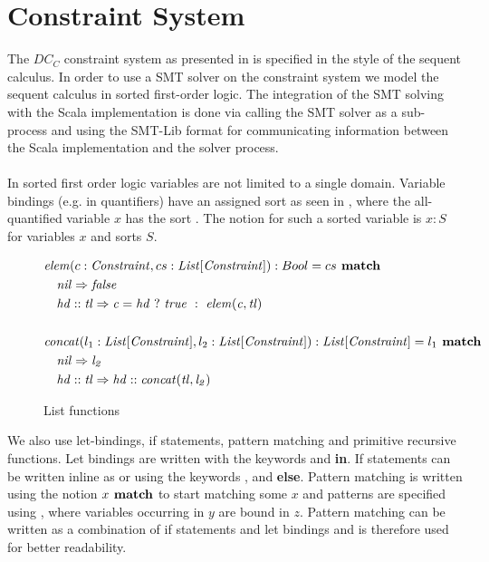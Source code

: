 \section{Constraint System}
\label{sec:constraintsystem}
The $DC_C$ constraint system as presented in 
is specified in the style of the sequent calculus.
In order to use a SMT solver on the constraint system
we model the sequent calculus in sorted first-order logic.
The integration of the SMT solving with the Scala implementation
is done via calling the SMT solver as a sub-process and using
the SMT-Lib format for communicating information between
the Scala implementation and the solver process.
\\ \\
In sorted first order logic variables are not limited to a single domain.
Variable bindings (e.g. in quantifiers)
have an assigned sort as seen in ,
where the all-quantified variable $x$ has the sort .
The notion for such a sorted variable is $x: S$
for variables $x$ and sorts $S$.
\begin{figure}[b]
\begin{align*}
&\mathit{elem}(c: \mathit{Constraint}, cs: \mathit{List[\mathit{Constraint}]}): Bool = cs \textbf{ match}\\
&\quad \mathit{\mathit{nil}} \Rightarrow \mathit{false}\\
&\quad \mathit{hd :: tl} \Rightarrow \mathit{c = hd\ ?\ true\ :\ \mathit{elem}(c, tl)}\\\\
&\mathit{concat}(l_1: \mathit{List[\mathit{Constraint}]}, l_2: \mathit{List[\mathit{Constraint}]}): \mathit{List[\mathit{Constraint}]} = l_1 \textbf{ match}\\
&\quad \mathit{\mathit{nil}} \Rightarrow \mathit{l_2}\\
&\quad \mathit{hd :: tl} \Rightarrow \mathit{hd :: \mathit{concat}(tl, l_2)}
\end{align*}
\caption{List functions}
\label{fig:fo-list-funs}
\end{figure}
%
We also use let-bindings, if statements, pattern matching and primitive recursive functions.
Let bindings are written with the keywords \Let and \textbf{in}.
If statements can be written inline as  or using
the keywords \If, \Then and \textbf{else}.
Pattern matching is written using the notion $x \textbf{ match}$ to start matching some $x$
and patterns are specified using ,
where variables occurring in $y$ are bound in $z$.
Pattern matching can be written as a combination of if statements and let bindings
and is therefore used for better readability.

